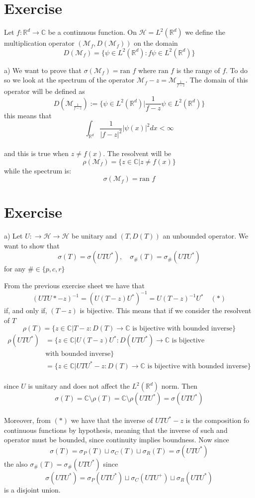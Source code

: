 \documentclass{article}
\newcommand{\R}{\mathbb{R}}
\newcommand{\C}{\mathbb{C}}
\newcommand{\M}{\mathcal{M}}
\begin{document}
\section{Exercise}
Let $f : \R^d \to \C$ be a continuous function. On $\mathcal{H} = L^2(\R^d)$ we define the multiplication operator $( \M_f, D(\M_f) )$ on the domain
\[
    D(\M_f) = \{ \psi \in L^2(\R^d) : f\psi \in L^2(\R^d) \}
\]

a) We want to prove that $\sigma(\M_f) = \mbox{ran }f$ where $\mbox{ran }f$ is the range of $f$. To do so we look at the spectrum of the operator $\M_f - z = \M_{\frac{1}{f-z}}$. The domain of this operator will be defined as 
\[
    D(\M_{\frac{1}{f-z}}) := \{ \psi \in L^2 (\R^d) | \frac{1}{f-z} \psi \in L^2(\R^d) \} 
\]
this means that \\
\[
    \int_{\R^d} \frac{1}{|f-z|^2} |\psi(x)|^2 dx < \infty
\]\\
and this is true when $z \neq f(x)$. The resolvent will be
\[
    \rho(\M_f) = \{ z\in \C | z \neq f(x) \}
\]
while the spectrum is:
\[
    \sigma(\M_f) = \mbox{ran }f
\]
\section{Exercise}
a) Let $U : \to \mathcal{H} \to \mathcal H $ be unitary and $(T, D(T))$ an unbounded operator. We want to show that 
\[
    \sigma(T) = \sigma(UTU^*), \quad \sigma_\#(T) = \sigma_\# (UTU^*)
\]
for any $\# \in \{ p,c,r \}$

From the previous exercise sheet we have that 
\[
    {(UTU* - z)}^{-1} = {(U(T-z)U^*)}^{-1} = U{(T-z)}^{-1} U^* \quad (*)
\]
if, and only if, $(T-z)$ is bijective. This means that if we consider the resolvent of $T$
\[
    \rho(T) = \{ z \in \C | T-z : D(T) \to \C \text{ is bijective with bounded inverse} \}
\]
\[
    \begin{split}
        \rho(UTU^*) &= \{ z \in \C | U(T-z)U^*  : D(UTU^*) \to \C 
        \text{ is bijective} \\
        & \text{with bounded inverse} \}\\
        &= \{ z \in \C | UTU^* -z  : D(T) \to \C \text{ is bijective with bounded inverse} \}
    \end{split}
\]\\
since $U$ is unitary and does not affect the $L^2(\R^d)$ norm. Then 
\[
    \sigma(T) = \C \setminus \rho(T)  = \C \setminus \rho({UTU^*}) = \sigma(UTU^*) 
\]\\
Moreover, from $(*)$ we have that the inverse of $UTU^* -z$ is the composition fo continuous functions by hypothesis, meaning that the inverse of such and operator must be bounded, since continuity implies boundness. Now since
\[
    \sigma (T) = \sigma_P(T) \sqcup  \sigma_C (T) \sqcup \sigma_R(T) = \sigma (UTU^*)
\]
the also $\sigma_{\#} (T) = \sigma_\# (UTU^*)$ since
\[
    \sigma (UTU^*)= \sigma_P(UTU^*) \sqcup  \sigma_C (UTU^+) \sqcup \sigma_R(UTU^*)
\]
is a disjoint union.
\end{document}
